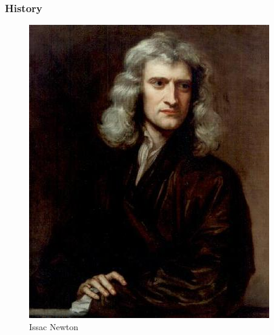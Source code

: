\documentclass{beamer}
\begin{document}
\begin{frame}[allowframebreaks]
  \frametitle {History}
  \begin{figure}
    \begin{minipage}{.45\textwidth}
      \includegraphics[width=\linewidth]{historyNewton} 
      \caption{Issac Newton}
    \end{minipage}\hfill
    \begin{minipage}{.45\textwidth}

\end{minipage}
\end{figure}
\end{frame}
\end{document}
